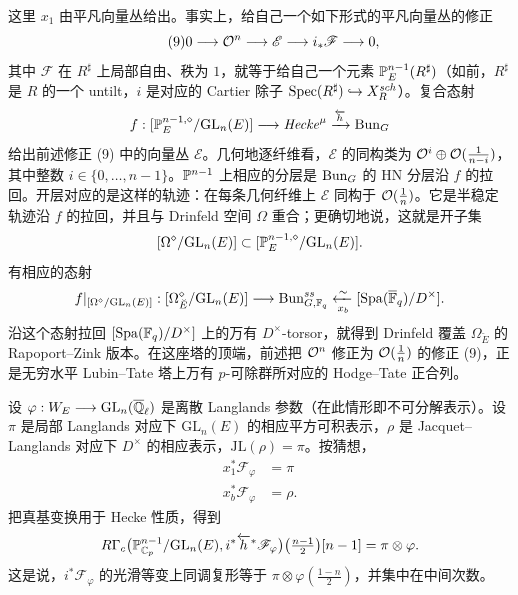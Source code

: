 这里 $x_1$ 由平凡向量丛给出。事实上，给自己一个如下形式的平凡向量丛的修正
\begin{equation}\label{eq:8.9}\tag{9}
0\longrightarrow\mathcal{O}^n\longrightarrow\mathscr{E}\longrightarrow i_*\mathscr{F}\longrightarrow 0,
\end{equation}
其中 $\mathscr{F}$ 在 $R^\sharp$ 上局部自由、秩为 $1$，就等于给自己一个元素 $\mathbb{P}^{n-1}_E(R^\sharp)$（如前，$R^\sharp$ 是 $R$ 的一个 untilt，$i$ 是对应的 Cartier 除子 $\operatorname{Spec}(R^\sharp)\hookrightarrow X_R^{sch}$）。复合态射
\[
f:[\mathbb{P}^{n-1,\diamond}_E/\mathrm{GL}_n(E)]\longrightarrow\mathit{Hecke}^{\mu}\xrightarrow{\overleftarrow{h}}\mathrm{Bun}_G
\]
给出前述修正 (9) 中的向量丛 $\mathscr{E}$。几何地逐纤维看，$\mathscr{E}$ 的同构类为 $\mathcal{O}^i\oplus\mathcal{O}(\frac{1}{n-i})$，其中整数 $i\in\{0,\dots,n-1\}$。$\mathbb{P}^{n-1}$ 上相应的分层是 $\mathrm{Bun}_G$ 的 HN 分层沿 $f$ 的拉回。开层对应的是这样的轨迹：在每条几何纤维上 $\mathscr{E}$ 同构于 $\mathcal{O}(\frac1n)$。它是半稳定轨迹沿 $f$ 的拉回，并且与 Drinfeld 空间 $\Omega$ 重合；更确切地说，这就是开子集
\[
[\Omega^{\diamond}/\mathrm{GL}_n(E)]\subset[\mathbb{P}^{n-1,\diamond}_E/\mathrm{GL}_n(E)].
\]
有相应的态射
\[
f|_{[\Omega^{\diamond}/\mathrm{GL}_n(E)]}:[\Omega^{\diamond}_{\breve{E}}/\mathrm{GL}_n(E)]\longrightarrow\mathrm{Bun}^{ss}_{G,\mathbb{F}_q}\xleftarrow[x_b]{\sim}[\mathrm{Spa}(\overline{\mathbb{F}}_q)/D^\times].
\]
沿这个态射拉回 $[\mathrm{Spa}(\mathbb{F}_q)/D^\times]$ 上的万有 $D^\times$-torsor，就得到 Drinfeld 覆盖 $\Omega_{\breve{E}}$ 的 Rapoport--Zink 版本。在这座塔的顶端，前述把 $\mathcal{O}^n$ 修正为 $\mathcal{O}(\frac1n)$ 的修正 (9)，正是无穷水平 Lubin--Tate 塔上万有 $p$-可除群所对应的 Hodge--Tate 正合列。

设 $\varphi:W_E\longrightarrow\mathrm{GL}_n(\overline{\mathbb{Q}}_\ell)$ 是离散 Langlands 参数（在此情形即不可分解表示）。设 $\pi$ 是局部 Langlands 对应下 $\mathrm{GL}_n(E)$ 的相应平方可积表示，$\rho$ 是 Jacquet--Langlands 对应下 $D^\times$ 的相应表示，$\mathrm{JL}(\rho)=\pi$。按猜想，
\[
\begin{aligned}
x_1^*\mathscr{F}_{\varphi}&=\pi\\
x_b^*\mathscr{F}_{\varphi}&=\rho.
\end{aligned}
\]
把真基变换用于 Hecke 性质，得到
\[
R\Gamma_c\big(\mathbb{P}^{n-1}_{\mathbb{C}_p}/\mathrm{GL}_n(E),i^*\overleftarrow{h}^*\mathscr{F}_{\varphi}\big)\big(\tfrac{n-1}{2}\big)[n-1]=\pi\otimes\varphi.
\]
这是说，$i^*\mathscr{F}_{\varphi}$ 的光滑等变上同调复形等于 $\pi\otimes\varphi(\frac{1-n}{2})$，并集中在中间次数。

